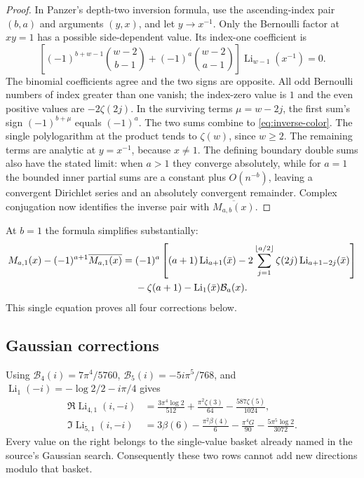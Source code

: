 \begin{proof}
In Panzer's depth-two inversion formula, use the ascending-index pair
$(b,a)$ and arguments $(y,x)$, and let $y\to x^{-1}$. Only the
Bernoulli factor at $xy=1$ has a possible side-dependent value. Its
index-one coefficient is
\[
 \left[(-1)^{b+w-1}\binom{w-2}{b-1}
       +(-1)^a\binom{w-2}{a-1}\right]
       \operatorname{Li}_{w-1}(x^{-1})=0.
\]
The binomial coefficients agree and the two signs are opposite.
All odd Bernoulli numbers of index greater than one vanish; the index-zero
value is $1$ and the even positive values are $-2\zeta(2j)$.
In the surviving terms $\mu=w-2j$, the first sum's sign
$(-1)^{b+\mu}$ equals $(-1)^a$. The two sums combine to
\eqref{eq:inverse-color}. The single polylogarithm at the product tends to
$\zeta(w)$, since $w\ge2$. The remaining terms are analytic at $y=x^{-1}$,
because $x\ne1$. The defining boundary double sums also have the stated
limit: when $a>1$ they converge absolutely, while for $a=1$ the bounded
inner partial sums are a constant plus $O(n^{-b})$, leaving a convergent
Dirichlet series and an absolutely convergent remainder. Complex
conjugation now identifies the inverse pair with
$\overline{M_{a,b}(x)}$.
\end{proof}

At $b=1$ the formula simplifies substantially:
\begin{align}
 M_{a,1}(x)-(-1)^{a+1}\overline{M_{a,1}(x)}
 ={}&(-1)^a\left[(a+1)\operatorname{Li}_{a+1}(\bar x)
       -2\sum_{j=1}^{\lfloor a/2\rfloor}
          \zeta(2j)\operatorname{Li}_{a+1-2j}(\bar x)\right]
 \label{eq:inverse-color-one}\\
 &-\zeta(a+1)-\operatorname{Li}_1(\bar x)\mathcal B_a(x).\notag
\end{align}
This single equation proves all four corrections below.

\subsection{Gaussian corrections}

Using $\mathcal B_4(i)=7\pi^4/5760$,
$\mathcal B_5(i)=-5i\pi^5/768$, and
$\operatorname{Li}_1(-i)=-\log2/2-i\pi/4$ gives
\begin{align}
 \Re\operatorname{Li}_{4,1}(i,-i)
  &=\frac{3\pi^4\log2}{512}+\frac{\pi^2\zeta(3)}{64}
                          -\frac{587\zeta(5)}{1024},
 \label{eq:gaussian-mixed-real}\\
 \Im\operatorname{Li}_{5,1}(i,-i)
  &=3\beta(6)-\frac{\pi^2\beta(4)}6-\frac{\pi^4G}{90}
                          -\frac{5\pi^5\log2}{3072}.
 \label{eq:gaussian-mixed-imag}
\end{align}
Every value on the right belongs to the single-value basket already named
in the source's Gaussian search. Consequently these two rows cannot add
new directions modulo that basket.

